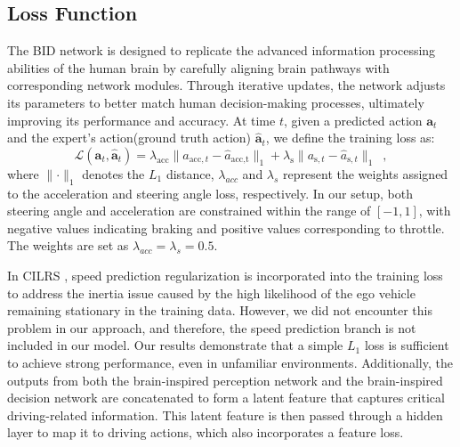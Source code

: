\subsection{Loss Function}

\hspace{1pc}The BID network is designed to replicate the advanced information processing abilities of the human brain by carefully aligning brain pathways with corresponding network modules. 
Through iterative updates, the network adjusts its parameters to better match human decision-making processes, ultimately improving its performance and accuracy.
%
At time $t$, given a predicted action $\mathbf{a}_{t}$ and the expert's action(ground truth action) $\hat{\mathbf{a}}_{t}$, we define the training loss as:
\begin{equation}\label{eq:loss}
	\mathcal{L}(\mathbf{a}_t, \hat{\mathbf{a}}_t) = \lambda_{\text{acc}}\lVert a_{\text{acc},t}-\hat{a}_{\text{acc,t}}\rVert_{1} + \lambda_{\text{s}} \lVert a_{\text{s},t}-\hat{a}_{\text{s},t} \rVert_{1} \enspace ,
\end{equation}
where $\lVert\cdot\rVert_{1}$ denotes the $L_1$ distance, $\lambda_{acc}$ and $\lambda_s$ represent the weights assigned to the acceleration and steering angle loss, respectively.
In our setup, both steering angle and acceleration are constrained within the range of $[-1, 1]$, with negative values indicating braking and positive values corresponding to throttle.
The weights are set as $\lambda_{acc} = \lambda_{s} = 0.5$. 


In CILRS \cite{Codevilla:2019}, speed prediction regularization is incorporated into the training loss to address the inertia issue caused by the high likelihood of the ego vehicle remaining stationary in the training data.
However, we did not encounter this problem in our approach, and therefore, the speed prediction branch is not included in our model.
Our results demonstrate that a simple $L_1$ loss is sufficient to achieve strong performance, even in unfamiliar environments.
%
Additionally, the outputs from both the brain-inspired perception network and the brain-inspired decision network are concatenated to form a latent feature that captures critical driving-related information. 
This latent feature is then passed through a hidden layer to map it to driving actions, which also incorporates a feature loss.


%


